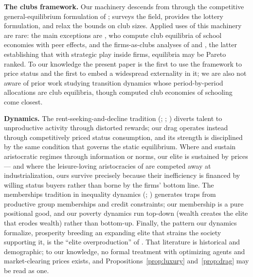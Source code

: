 \documentclass[12pt,letterpaper]{article}
\theoremstyle{definition}
\begin{document}
\textbf{The clubs framework.}
Our machinery descends from \citet{buchanan1965clubs} through the competitive general-equilibrium formulation of \citet{ellickson1999clubs,ellickson2001clubs,ellickson2006organization}; \citet{scotchmer2002clubs} surveys the field, \citet{coleprescott1997valuation} provides the lottery formulation, and \citet{allouchwooders2008} relax the bounds on club sizes.
Applied uses of this machinery are rare: the main exceptions are \citet{caucutt2001peer,caucutt2002vouchers}, who compute club equilibria of school economies with peer effects, and the firms-as-clubs analyses of \citet{prescotttownsend2006firms} and \citet{zame2007incentives}, the latter establishing that with strategic play inside firms, equilibria may be Pareto ranked.
To our knowledge the present paper is the first to use the framework to price status and the first to embed a widespread externality in it; we are also not aware of prior work studying transition dynamics whose period-by-period allocations are club equilibria, though computed club economies of schooling \citep{caucutt2001peer,caucutt2002vouchers} come closest.

\textbf{Dynamics.}
The rent-seeking-and-decline tradition (\citealt{murphyshleifervishny1991}; \citealt{baumol1990entrepreneurship}; \citealt{acemoglu1995reward}) diverts talent to unproductive activity through distorted rewards; our drag operates instead through competitively priced status consumption, and its strength is disciplined by the same condition that governs the static equilibrium.
Where \citet{hasslermora2000} and \citet{colemailathpostlewaite1992} sustain aristocratic regimes through information or norms, our elite is sustained by prices --- and where the leisure-loving aristocracies of \citet{doepkezilibotti2008} are competed away at industrialization, ours survive precisely because their inefficiency is financed by willing status buyers rather than borne by the firms' bottom line.
The memberships tradition in inequality dynamics (\citealt{durlauf1996persistent}; \citealt{galorzeira1993}) generates traps from productive group memberships and credit constraints; our membership is a pure positional good, and our poverty dynamics run top-down (wealth creates the elite that erodes wealth) rather than bottom-up.
Finally, the pattern our dynamics formalize, prosperity breeding an expanding elite that strains the society supporting it, is the ``elite overproduction'' of \citet{turchin2023endtimes}.
That literature is historical and demographic; to our knowledge, no formal treatment with optimizing agents and market-clearing prices exists, and Propositions~\ref{prop:luxury} and~\ref{prop:drag} may be read as one.
\end{document}
